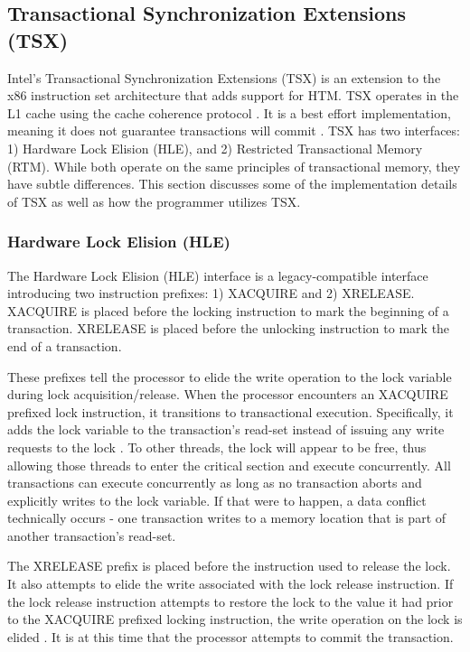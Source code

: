 \documentclass[a4paper]{article}
\begin{document}
\subsection{\textbf{Transactional Synchronization Extensions (TSX)}}

\indent
Intel's Transactional Synchronization Extensions (TSX) is an extension
to the x86 instruction set architecture that adds support for HTM.  TSX operates
in the L1 cache using the cache coherence protocol \cite{intel_opt_man}.  It is
a best effort implementation, meaning it does not guarantee transactions will
commit \cite{intel_prog_ref}.  TSX has two interfaces: 1) Hardware Lock Elision
(HLE), and 2) Restricted Transactional Memory (RTM).  While both operate on the
same principles of transactional memory, they have subtle differences.  This
section discusses some of the implementation details of TSX as well as how the
programmer utilizes TSX.
\par

\subsubsection{\textbf{Hardware Lock Elision (HLE)}}\label{sec:hle}

\indent 
The Hardware Lock Elision (HLE) interface is a legacy-compatible
interface introducing two instruction prefixes: 1) XACQUIRE and 2) XRELEASE.
XACQUIRE is placed before the locking instruction to mark the beginning of a
transaction.  XRELEASE is placed before the unlocking instruction to mark the
end of a transaction.
\par

\indent 
These prefixes tell the processor to elide the write operation to the lock
variable during lock acquisition/release.  When the processor encounters an
XACQUIRE prefixed lock instruction, it transitions to transactional execution.
Specifically, it adds the lock variable to the transaction's read-set instead of
issuing any write requests to the lock \cite{intel_prog_ref}.  To other threads,
the lock will appear to be free, thus allowing those threads to enter the
critical section and execute concurrently.  All transactions can execute
concurrently as long as no transaction aborts and explicitly writes to the lock
variable.  If that were to happen, a data conflict technically occurs - one
transaction writes to a memory location that is part of another transaction's
read-set.
\par

\indent 
The XRELEASE prefix is placed before the instruction used to release the
lock.  It also attempts to elide the write associated with the lock release
instruction.  If the lock release instruction attempts to restore the lock to the
value it had prior to the XACQUIRE prefixed locking instruction, the write
operation on the lock is elided \cite{intel_prog_ref}.  It is at this time that
the processor attempts to commit the transaction.
\par
\end{document}
